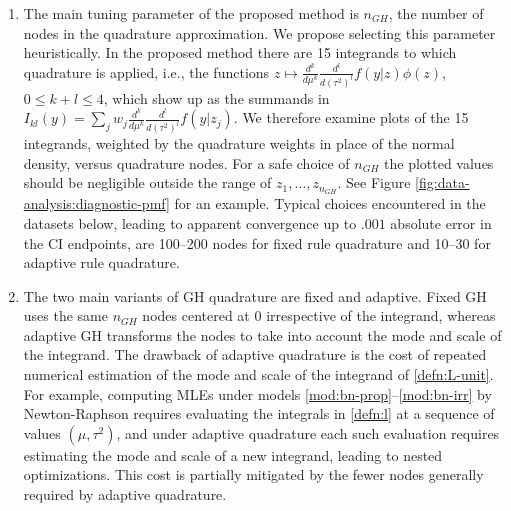 \documentclass[12pt]{article}
\newcommand{\F}{I}
\newcommand{\z}{z}
\newcommand{\y}{y}
\newcommand{\nGH}{n_{GH}}
\newcommand{\w}{w}
\newcommand{\effect}{\mu}
\newcommand{\comment}[2][red]{%
 \iftoggle{commenttoggle}{%
  {\normalsize{\color{#1}{#2}}\normalsize}%
 }{%
 }%
}
\begin{document}
\begin{enumerate}


\item The main tuning parameter of the proposed method is $\nGH$, the
  number of nodes in the quadrature approximation. We propose selecting
  this parameter heuristically. In the proposed method there are 15
  integrands to which quadrature is applied, i.e., the functions $z\mapsto \frac{d^k}{d\mu^k}\frac{d^l}{d(\tau^2)^l}
  f(y|\z)\phi(z)$, $0\le k+l \le 4$, which show up as the summands in
  $\F_{kl}(\y)=\sum_{j} \w_j \frac{d^k}{d\mu^k}\frac{d^l}{d(\tau^2)^l}
  f(y|\z_j)$. We therefore examine plots of the 15
  integrands, weighted by the quadrature weights in place of the
  normal density, versus quadrature nodes. For a safe choice of $\nGH$ the plotted values should be negligible outside the range of $z_1,\ldots,z_{\nGH}$. See Figure \ref{fig:data-analysis:diagnostic-pmf} for an
  example. Typical choices encountered in the datasets below, leading
  to apparent convergence up to $.001$ absolute error in the CI
  endpoints, are 100--200 nodes for fixed rule quadrature and 10--30
  for adaptive rule quadrature.


\item The two main variants of GH quadrature are fixed and
  adaptive. Fixed GH uses the same $\nGH$  nodes centered at $0$
  irrespective of the integrand, whereas adaptive GH
  transforms the nodes to take into account the mode and scale of the
  integrand. The drawback of adaptive quadrature is the cost of
  repeated numerical estimation of the mode and scale of the
  integrand of \eqref{defn:L-unit}. For example, computing  MLEs
  under models \eqref{mod:bn-prop}--\eqref{mod:bn-irr} by Newton-Raphson requires evaluating the
  integrals in \eqref{defn:l} at a sequence of values $(\effect,\tau^2)$, and
  under adaptive quadrature each such evaluation requires estimating
  the mode and scale of a new integrand, leading to nested
  optimizations. This cost is partially mitigated by the fewer nodes
  generally required by adaptive quadrature.


\end{enumerate}
\end{document}
